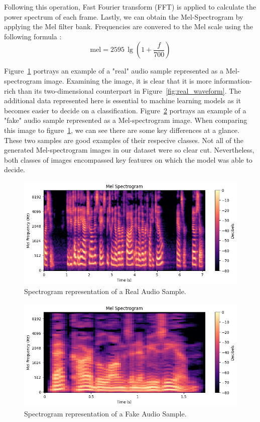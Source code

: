 \documentclass[conference]{IEEEtran}
\begin{document}
Following this operation, Fast Fourier transform (FFT) is applied to calculate the power spectrum of each frame. Lastly, we can obtain the Mel-Spectrogram by applying the Mel filter bank. Frequencies are convered to the Mel scale using the following formula \cite{9252126}:
\begin{equation}
\text{mel} = 2595 \, \lg\left(1 + \frac{f}{700}\right)
\end{equation}

Figure~\ref{fig:real_spectrogram} portrays an example of a "real" audio sample represented as a Mel-spectrogram image. Examining the image, it is clear that it is more information-rich than its two-dimensional counterpart in Figure~\ref{fig:real_waveform}. The additional data represented here is essential to machine learning models as it becomes easier to decide on a classification. Figure~\ref{fig:fake_spectrogram} portrays an example of a "fake" audio sample represented as a Mel-spectrogram image. When comparing this image to figure~\ref{fig:real_spectrogram}, we can see there are some key differences at a glance. These two samples are good examples of their respecive classes. Not all of the generated Mel-spectrogram images in our dataset were so clear cut. Nevertheless, both classes of images encompassed key features on which the model was able to decide. 

\begin{figure}
  \centering
  \includegraphics[width=\linewidth]{images/real_spectrogram.png}
  \caption{Spectrogram representation of a Real Audio Sample.}
  \label{fig:real_spectrogram}
\end{figure}

\begin{figure}
  \centering
  \includegraphics[width=\linewidth]{images/fake_spectrogram.png}
  \caption{Spectrogram representation of a Fake Audio Sample.}
  \label{fig:fake_spectrogram}
\end{figure}
\end{document}
